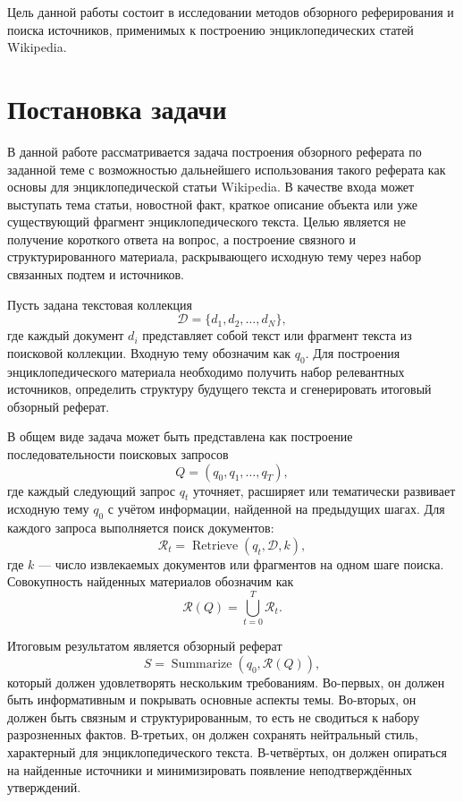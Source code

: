 \documentclass[oneside,senior,etd]{BYUPhys}
\begin{document}
Цель данной работы состоит в исследовании методов обзорного реферирования и поиска источников, применимых к построению энциклопедических статей Wikipedia.

\section{Постановка задачи}

В данной работе рассматривается задача построения обзорного реферата по заданной теме с возможностью дальнейшего использования такого реферата как основы для энциклопедической статьи Wikipedia. 
В качестве входа может выступать тема статьи, новостной факт, краткое описание объекта или уже существующий фрагмент энциклопедического текста. Целью является не получение короткого ответа на вопрос, 
а построение связного и структурированного материала, раскрывающего исходную тему через набор связанных подтем и источников.

Пусть задана текстовая коллекция
\[
\mathcal{D} = \{d_1, d_2, \ldots, d_N\},
\]
где каждый документ $d_i$ представляет собой текст или фрагмент текста из поисковой коллекции. Входную тему обозначим как $q_0$. Для построения энциклопедического материала необходимо получить набор релевантных источников, определить структуру будущего текста и сгенерировать итоговый обзорный реферат.

В общем виде задача может быть представлена как построение последовательности поисковых запросов
\[
Q = (q_0, q_1, \ldots, q_T),
\]
где каждый следующий запрос $q_t$ уточняет, расширяет или тематически развивает исходную тему $q_0$ с учётом информации, найденной на предыдущих шагах. Для каждого запроса выполняется поиск документов:
\[
\mathcal{R}_t = \operatorname{Retrieve}(q_t, \mathcal{D}, k),
\]
где $k$ --- число извлекаемых документов или фрагментов на одном шаге поиска. Совокупность найденных материалов обозначим как
\[
\mathcal{R}(Q) = \bigcup_{t=0}^{T} \mathcal{R}_t.
\]

Итоговым результатом является обзорный реферат
\[
S = \operatorname{Summarize}(q_0, \mathcal{R}(Q)),
\]
который должен удовлетворять нескольким требованиям. Во-первых, он должен быть информативным и покрывать основные аспекты темы. Во-вторых, он должен быть связным и структурированным, то есть не сводиться к набору разрозненных фактов. В-третьих, он должен сохранять нейтральный стиль, характерный для энциклопедического текста. В-четвёртых, он должен опираться на найденные источники и минимизировать появление неподтверждённых утверждений.
\end{document}
